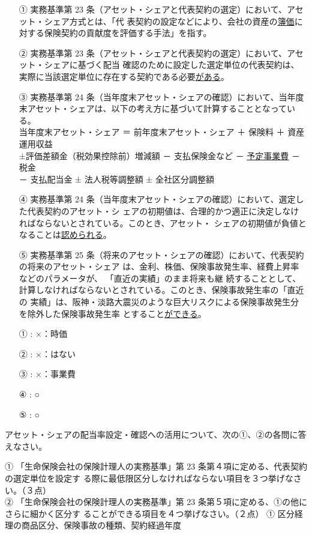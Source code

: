 \documentclass[report,gutter=10mm,fore-edge=10mm,uplatex,dvipdfmx]{jlreq}
\begin{document}
\begin{itemize}
 \item [①] 実務基準第 23 条（アセット・シェアと代表契約の選定）において、アセット・シェア方式とは、「代
表契約の設定などにより、会社の資産の\underline{簿価}に対する保険契約の貢献度を評価する手法」を指す。
 \item [②] 実務基準第 23 条（アセット・シェアと代表契約の選定）において、アセット・シェアに基づく配当
確認のために設定した選定単位の代表契約は、実際に当該選定単位に存在する契約である必要\underline{がある}。
\item[③] 実務基準第 24 条（当年度末アセット・シェアの確認）において、当年度末アセット・シェアは、以下の考え方に基づいて計算することとなっている。\\
当年度末アセット・シェア ＝ 前年度末アセット・シェア ＋ 保険料 ＋ 資産運用収益\\
±評価差額金（税効果控除前）増減額 － 支払保険金など － \underline{予定事業費} － 税金\\
－ 支払配当金 ± 法人税等調整額 ± 全社区分調整額
\item[④] 実務基準第 24 条（当年度末アセット・シェアの確認）において、選定した代表契約のアセット・シ
ェアの初期値は、合理的かつ適正に決定しなければならないとされている。このとき、アセット・
シェアの初期値が負値となることは\underline{認められる}。
\item[⑤] 実務基準第 25 条（将来のアセット・シェアの確認）において、代表契約の将来のアセット・シェア
は、金利、株価、保険事故発生率、経費上昇率などのパラメータが、
「直近の実績」のまま将来も継
続することとして、計算しなければならないとされている。このとき、保険事故発生率の「直近の
実績」は、阪神・淡路大震災のような巨大リスクによる保険事故発生分を除外した保険事故発生率
とすること\underline{ができる}。
\end{itemize}
\answer{}
\begin{itemize}
\item[ ① : ]  ×：時価 
\item[ ② : ]  ×：はない 
\item[ ③ : ]  ×：事業費 
\item[ ④ : ]  ○ 
\item[ ⑤ : ]  ○
\end{itemize}

アセット・シェアの配当率設定・確認への活用について、次の①、②の各問に答えなさい。\vspace{1zh}

\noindent ① 「生命保険会社の保険計理人の実務基準」第 23 条第４項に定める、代表契約の選定単位を設定す
る際に最低限区分しなければならない項目を３つ挙げなさい。（３点）\\
② 「生命保険会社の保険計理人の実務基準」第 23 条第５項に定める、①の他にさらに細かく区分す
ることができる項目を４つ挙げなさい。（２点）
\answer{}
① 区分経理の商品区分、保険事故の種類、契約経過年度
\end{document}
